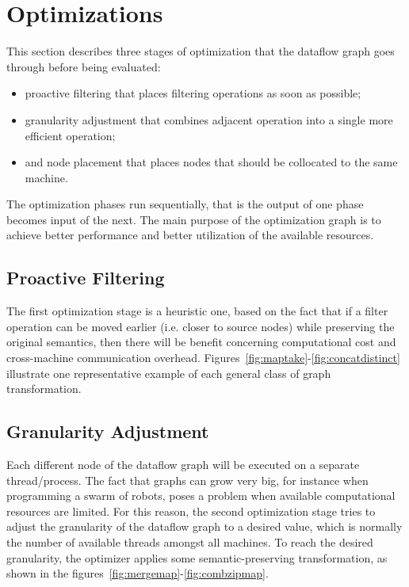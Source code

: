 \documentclass[sigplan,screen,10pt]{acmart}
\begin{document}

\section{Optimizations} \label{sec:optimization}

This section describes three stages of optimization that the dataflow graph goes
through before being evaluated:
\begin{itemize}
  \item proactive filtering that places filtering operations as soon as possible;
  \item granularity adjustment that combines adjacent operation into a single more efficient operation;
  \item and node placement that places nodes that should be collocated to the same machine.
\end{itemize}
The optimization phases run sequentially, that is the output of one phase becomes
input of the next. The main purpose of the optimization graph is to achieve better
performance and better utilization of the available resources.

\subsection{Proactive Filtering}
The first optimization stage is a heuristic one, based on the fact that if a
filter operation can be moved earlier (i.e. closer to source nodes) while
preserving the original semantics, then there will be benefit concerning
computational cost and cross-machine communication overhead. Figures~\ref{fig:maptake}-\ref{fig:concatdistinct}
illustrate one representative example of each general class of
graph transformation.


\subsection{Granularity Adjustment}
Each different node of the dataflow graph will be executed on a separate
thread/process. The fact that graphs can grow very big, for instance when
programming a swarm of robots, poses a problem when available
computational resources are limited. For this reason, the second optimization
stage tries to adjust the granularity of the dataflow graph to a desired value,
which is normally the number of available threads amongst all machines.
To reach the desired granularity, the optimizer applies some semantic-preserving
transformation, as shown in the figures~\ref{fig:mergemap}-\ref{fig:combzipmap}.
\end{document}
